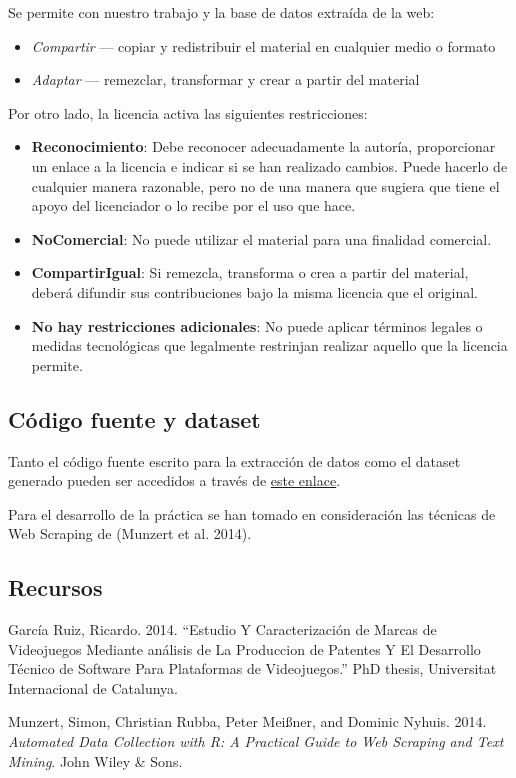 \documentclass[]{article}
\providecommand{\tightlist}{%
  \setlength{\itemsep}{0pt}\setlength{\parskip}{0pt}}
\begin{document}
Se permite con nuestro trabajo y la base de datos extraída de la web:

\begin{itemize}
\tightlist
\item
  \emph{Compartir} --- copiar y redistribuir el material en cualquier
  medio o formato
\item
  \emph{Adaptar} --- remezclar, transformar y crear a partir del
  material
\end{itemize}

Por otro lado, la licencia activa las siguientes restricciones:

\begin{itemize}
\tightlist
\item
  \textbf{Reconocimiento}: Debe reconocer adecuadamente la autoría,
  proporcionar un enlace a la licencia e indicar si se han realizado
  cambios. Puede hacerlo de cualquier manera razonable, pero no de una
  manera que sugiera que tiene el apoyo del licenciador o lo recibe por
  el uso que hace.
\item
  \textbf{NoComercial}: No puede utilizar el material para una finalidad
  comercial.
\item
  \textbf{CompartirIgual}: Si remezcla, transforma o crea a partir del
  material, deberá difundir sus contribuciones bajo la misma licencia
  que el original.
\item
  \textbf{No hay restricciones adicionales}: No puede aplicar términos
  legales o medidas tecnológicas que legalmente restrinjan realizar
  aquello que la licencia permite.
\end{itemize}

\subsection{Código fuente y dataset}\label{codigo-fuente-y-dataset}

Tanto el código fuente escrito para la extracción de datos como el
dataset generado pueden ser accedidos a través de
\href{https://github.com/rgarciarui/videogamesScrapper}{este enlace}.

Para el desarrollo de la práctica se han tomado en consideración las
técnicas de Web Scraping de (Munzert et al. 2014).

\subsection*{Recursos}\label{recursos}

\hypertarget{refs}{}
\hypertarget{ref-ruiz2014estudio}{}
García Ruiz, Ricardo. 2014. ``Estudio Y Caracterización de Marcas de
Videojuegos Mediante análisis de La Produccion de Patentes Y El
Desarrollo Técnico de Software Para Plataformas de Videojuegos.''
PhD thesis, Universitat Internacional de Catalunya.

\hypertarget{ref-munzert2014automated}{}
Munzert, Simon, Christian Rubba, Peter Meißner, and Dominic Nyhuis.
2014. \emph{Automated Data Collection with R: A Practical Guide to Web
Scraping and Text Mining}. John Wiley \& Sons.
\end{document}

